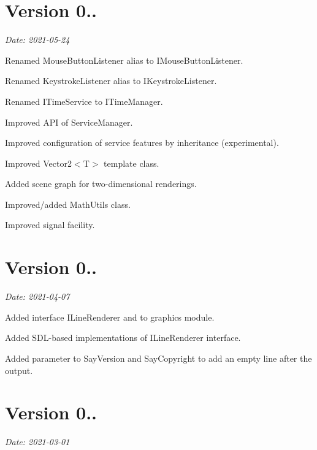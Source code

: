 \section*{Version 0..}

{\itshape Date\+: 2021-\/05-\/24}


\begin{DoxyItemize}
\item Renamed {\ttfamily Mouse\+Button\+Listener} alias to {\ttfamily I\+Mouse\+Button\+Listener}.
\item Renamed {\ttfamily Keystroke\+Listener} alias to {\ttfamily I\+Keystroke\+Listener}.
\item Renamed {\ttfamily I\+Time\+Service} to {\ttfamily I\+Time\+Manager}.
\item Improved A\+PI of {\ttfamily Service\+Manager}.
\item Improved configuration of service features by inheritance (experimental).
\item Improved {\ttfamily Vector2$<$T$>$} template class.
\item Added scene graph for two-\/dimensional renderings.
\item Improved/added {\ttfamily Math\+Utils} class.
\item Improved signal facility.
\end{DoxyItemize}

\section*{Version 0..}

{\itshape Date\+: 2021-\/04-\/07}


\begin{DoxyItemize}
\item Added interface {\ttfamily I\+Line\+Renderer} and to graphics module.
\item Added S\+D\+L-\/based implementations of {\ttfamily I\+Line\+Renderer} interface.
\item Added parameter to {\ttfamily Say\+Version} and {\ttfamily Say\+Copyright} to add an empty line after the output.
\end{DoxyItemize}

\section*{Version 0..}

{\itshape Date\+: 2021-\/03-\/01}


